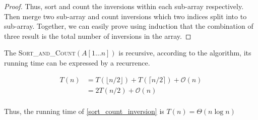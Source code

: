 \begin{homeworkProblem}[Inversions]
\begin{proof}
    Thus, sort and count the inversions within each sub-array respectively. Then merge two
    sub-array and count inversions which two indices split into to sub-array.
    Together, we can easily prove using induction that the combination of
    three result is the total number of inversions in the array.
\end{proof}

The \textsc{Sort\_and\_Count}$(A[1 \ldots n])$ is recursive, according to the algorithm,
its running time can be expressed by a recurrence.

\begin{equation}
\begin{split}
    T(n) & = T(\lfloor n/2 \rfloor) + T(\lceil n/2 \rceil) + \mathcal{O}(n) \\
         & = 2T(n/2) + \mathcal{O}(n) \\
\end{split}
\end{equation}

Thus, the running time of \cref{sort_count_inversion} is $T(n) = \Theta(n \log n)$

\end{homeworkProblem}
